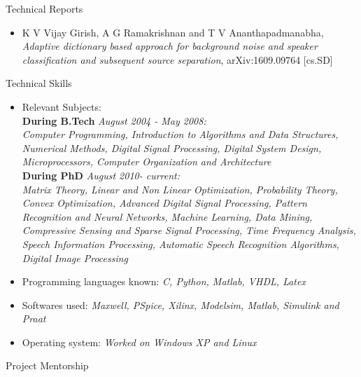 \documentclass[10pt]{article}
\begin{document}
\begin{cv}
\begin{cvlist}{Technical Reports}
\begin{itemize}
\item  K V Vijay Girish, A G Ramakrishnan and T V Ananthapadmanabha,  \textit{Adaptive dictionary based approach for background noise and speaker classification and subsequent source separation}, 	arXiv:1609.09764 [cs.SD]
\end{itemize}
\end{cvlist}

\begin{cvlist}{Technical Skills}
\item
\begin{itemize}\itemsep=0.25em
	\item Relevant Subjects:\\
	\textbf{During B.Tech}  \textit{August 2004 - May 2008:}\\
 \textit{Computer Programming, Introduction to Algorithms and Data Structures, Numerical Methods, Digital Signal Processing, Digital System Design,  Microprocessors,
Computer Organization and Architecture}\\
\textbf{During PhD} \textit{August 2010- current:}\\
\textit{Matrix Theory,
Linear and Non Linear Optimization, Probability Theory,  Convex Optimization,
Advanced Digital Signal Processing,
Pattern Recognition and Neural Networks, Machine Learning, Data Mining, Compressive Sensing and Sparse Signal Processing, Time Frequency Analysis, Speech Information Processing, Automatic Speech Recognition Algorithms, Digital Image Processing}



	\item Programming languages known:
 \textit{C, Python, Matlab, VHDL,  Latex}

\item Softwares used: \textit{Maxwell, PSpice, Xilinx, Modelsim, Matlab, Simulink and Praat}
\item Operating system: \textit{Worked on Windows XP and Linux}



	\end{itemize}

\end{cvlist}




\begin{cvlist}{Project Mentorship}
\item
\begin{itemize}



\end{itemize}
\end{cvlist}
\end{cv}
\end{document}
